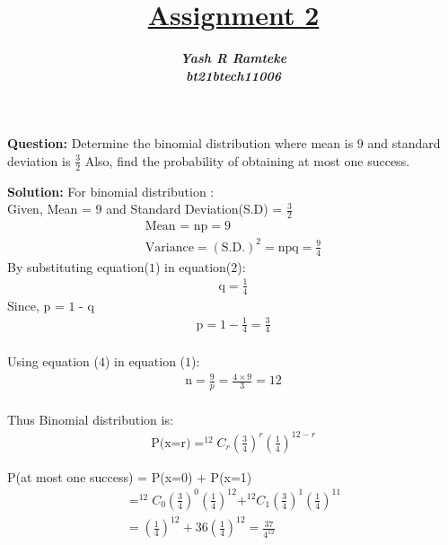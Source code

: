 \documentclass[journal,12pt,twocolumn]{IEEEtran}
\title{\textbf{\underline{Assignment 2}}}
\author{\textbf{\textit{Yash R Ramteke}}\\
\textbf{\textit{bt21btech11006}}}
\begin{document}
\maketitle

\textbf{Question:}
Determine the binomial distribution where mean is $9$ and standard deviation is $\frac{3}{2}$ Also, find the probability of obtaining at most one success.

\bigskip
\textbf{Solution:}
For binomial distribution :\\
Given, Mean = $9$ and Standard Deviation(S.D) = $\frac{3}{2}$
\begin{align}
    \text{Mean = np} = 9
    \\
    \text{Variance} = (\text{S.D.})^{2} = \text{npq} = \frac{9}{4}
\end{align}
By substituting equation($1$) in equation($2$):
\begin{align}
      \text{q} = \frac{1}{4}
\end{align}
Since, p = $1$ - q
\begin{align}
      \text{p} = 1 - \frac{1}{4} = \frac{3}{4} 
\end{align}\\
Using equation ($4$) in equation ($1$):
\begin{align}
      \text{n} = \frac{9}{p} = \frac{4\times9}{3} = 12
\end{align}\\
Thus Binomial distribution is:
\begin{align*}
\text{P(x=r)} = ^{12}C_r \left(\frac{3}{4}\right)^r \left(\frac{1}{4}\right)^{12-r}
\end{align*}

\begin{center}
\end{center}
P(at most one success) = P(x=0) + P(x=1)
\begin{align*}
= ^{12}C_0 \left({\frac{3}{4}}\right)^0 \left(\frac{1}{4}\right)^{12} + ^{12}C_1 \left(\frac{3}{4}\right)^1 \left(\frac{1}{4}\right)^{11} 
\\
= \left(\frac{1}{4}\right)^{12} + 36\left(\frac{1}{4}\right)^{12} =  \frac{37}{4^{12}}
\end{align*}
\end{document}
